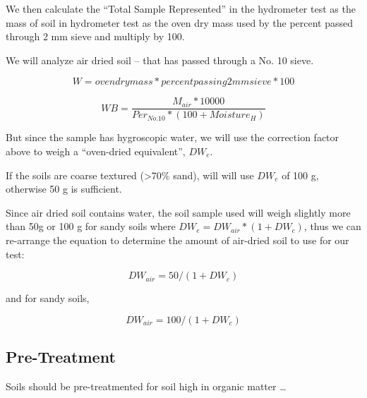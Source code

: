 \documentclass{tufte-handout}
\begin{document}
We then calculate the ``Total Sample Represented'' in the hydrometer test as the mass of soil in hydrometer test as the oven dry mass used by the percent passed through 2 mm sieve and multiply by 100.

We will analyze air dried soil -- that has passed through a No. 10 sieve. 


\begin{equation}
W = oven dry mass * percent passing 2mm sieve * 100
\end{equation}

\begin{equation}
WB = \frac{M_{air}*10000}{Per_{No.10} * (100 + Moisture_H)}
\end{equation}

But since the sample has hygroscopic water, we will use the correction factor above to weigh a ``oven-dried equivalent'', $DW_e$. 

If the soils are coarse textured (>70\% sand), will will use $DW_e$ of 100 g, otherwise 50 g is sufficient.

Since air dried soil contains water, the soil sample used will weigh slightly more than 50g or 100 g for sandy soils where $DW_e = DW_{air} * (1 + DW_c)$, thus we can re-arrange the equation to determine the amount of air-dried soil to use for our test:

\begin{equation}
DW_{air} = 50/(1+DW_c)
\end{equation}

and for sandy soils,

\begin{equation}
DW_{air} = 100/(1+DW_c)
\end{equation}

\subsection{Pre-Treatment}

Soils should be pre-treatmented for soil high in organic matter \ldots
\end{document}
